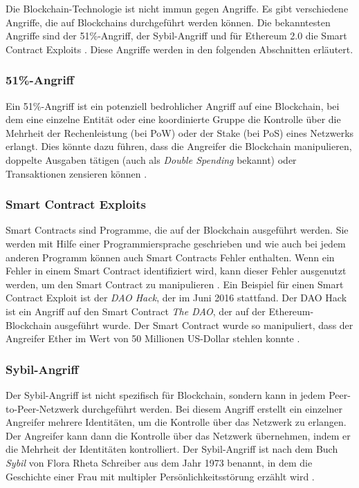 Die Blockchain-Technologie ist nicht immun gegen Angriffe. Es gibt verschiedene Angriffe, die auf Blockchains durchgeführt werden können. Die bekanntesten Angriffe sind der 51\%-Angriff, der Sybil-Angriff und für Ethereum 2.0 die Smart Contract Exploits \Parencites[S. 95034]{Nam_51PercentAttacks}[S. 251]{Douceur_SybilAttack}. Diese Angriffe werden in den folgenden Abschnitten erläutert.

\subsubsection{51\%-Angriff}

Ein 51\%-Angriff ist ein potenziell bedrohlicher Angriff auf eine Blockchain, bei dem eine einzelne Entität oder eine koordinierte Gruppe die Kontrolle über die Mehrheit der Rechenleistung (bei PoW) oder der Stake (bei PoS) eines Netzwerks erlangt. Dies könnte dazu führen, dass die Angreifer die Blockchain manipulieren, doppelte Ausgaben tätigen (auch als \textit{Double Spending} bekannt) oder Transaktionen zensieren können \Parencites[S. 95034]{Nam_51PercentAttacks}[S. 2]{Rosenfeld_DoubleSpending}.

\subsubsection{Smart Contract Exploits}

Smart Contracts sind Programme, die auf der Blockchain ausgeführt werden. Sie werden mit Hilfe einer Programmiersprache geschrieben und wie auch bei jedem anderen Programm können auch Smart Contracts Fehler enthalten. Wenn ein Fehler in einem Smart Contract identifiziert wird, kann dieser Fehler ausgenutzt werden, um den Smart Contract zu manipulieren \Parencite[S. 1-2]{Perez_SmartContractVulnerabilities}. Ein Beispiel für einen Smart Contract Exploit ist der \textit{DAO Hack}, der im Juni 2016 stattfand. Der DAO Hack ist ein Angriff auf den Smart Contract \textit{The DAO}, der auf der Ethereum-Blockchain ausgeführt wurde. Der Smart Contract wurde so manipuliert, dass der Angreifer Ether im Wert von 50 Millionen US-Dollar stehlen konnte \Parencite{Pratap_DAOHack}.


\subsubsection{Sybil-Angriff}

Der Sybil-Angriff ist nicht spezifisch für Blockchain, sondern kann in jedem Peer-to-Peer-Netzwerk durchgeführt werden. Bei diesem Angriff erstellt ein einzelner Angreifer mehrere Identitäten, um die Kontrolle über das Netzwerk zu erlangen. Der Angreifer kann dann die Kontrolle über das Netzwerk übernehmen, indem er die Mehrheit der Identitäten kontrolliert. Der Sybil-Angriff ist nach dem Buch \textit{Sybil} von Flora Rheta Schreiber  aus dem Jahr 1973 benannt, in dem die Geschichte einer Frau mit multipler Persönlichkeitsstörung erzählt wird \parencite[S. 251]{Douceur_SybilAttack}.


